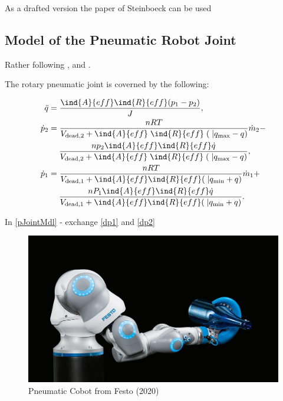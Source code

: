\documentclass[conference]{IEEEtran}
\newcommand{\Aeff}{\ind{A}{eff} }
\newcommand{\Reff}{\ind{R}{eff}}
\newcommand{\abs}{|}
\begin{document}
As a drafted version the paper of Steinboeck can be used \cite{STADLER2022105071}

\subsection{Model of the Pneumatic Robot Joint}

Rather following \cite{HoffmannIFAC23}, and  \cite{Hoffmann2023}.

The rotary pneumatic joint is coverned by the following:

\begin{subequations} \label{pJointMdl}
  \begin{align}
    \ddot q  & =  \frac{\Aeff\Reff (p_1-p_2)}{J} , \\
    \nonumber
    \dot p_2 &= \frac{n  R T}{V_{\mathrm {dead,2}} + \Aeff\;\Reff\;(\;\abs{q_{\mathrm {max}}}-q)}  \dot{m}_2 - \\ \label{dp2}
                  & \;\quad \frac{n  p_2  \Aeff \Reff \dot q}{V_{\mathrm{dead,2}} + \Aeff\;\Reff\;( \;\abs{q_{\mathrm{max}}}-q)} ,\\
    \nonumber
    \dot p_1 &= \frac{n  R T}{V_{\mathrm {dead,1}} +  \Aeff\Reff(\;\abs{q_{\mathrm {min}}}+q)}  \dot{m}_1 +  \\\label{dp1}
        & \;\quad \frac{n  P_1  \Aeff \Reff  \dot q}{V_{\mathrm {dead,1}} +  \Aeff\Reff(\;\abs{q_{\mathrm {min}}}+q)}       . 
  \end{align}
\end{subequations}

In \eqref{pJointMdl} - exchange \eqref{dp1} and \eqref{dp2}
\begin{figure}[htbp]
\centerline{\includegraphics[width=\columnwidth]{./pictures/octopusgripper.jpg}}
\caption{Pneumatic Cobot from Festo (2020)}
\label{fig:Octopus}
\end{figure}
\end{document}
